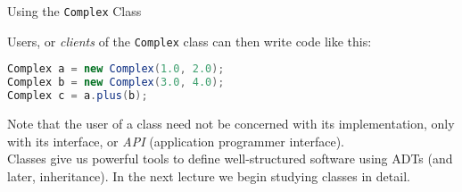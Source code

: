 \documentclass{beamer}
\begin{document}
\begin{frame}[fragile]{Using the {\tt Complex} Class}


Users, or {\it clients} of the {\tt Complex} class can then write code like this:
\begin{lstlisting}[language=Java]
Complex a = new Complex(1.0, 2.0);
Complex b = new Complex(3.0, 4.0);
Complex c = a.plus(b);
\end{lstlisting}

Note that the user of a class need not be concerned with its implementation, only with its interface, or {\it API} (application programmer interface).\\
\vspace{.1in}
Classes give us powerful tools to define well-structured software using ADTs (and later, inheritance).  In the next lecture we begin studying classes in detail.


\end{frame}








\end{document}
